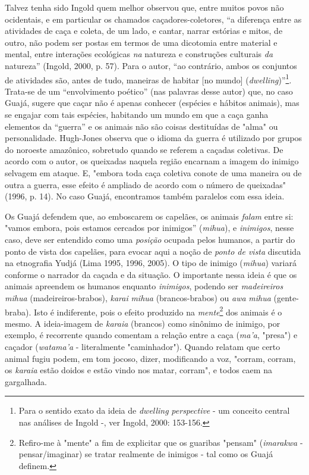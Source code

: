 Talvez tenha sido Ingold quem melhor observou que, entre muitos povos
não ocidentais, e em particular os chamados caçadores-coletores, ``a
diferença entre as atividades de caça e coleta, de um lado, e cantar,
narrar estórias e mitos, de outro, não podem ser postas em termos de uma
dicotomia entre material e mental, entre interações ecológicas \emph{na}
natureza e construções culturais \emph{da} natureza'' (Ingold, 2000, p.
57). Para o autor, ``ao contrário, ambos os conjuntos de atividades são,
antes de tudo, maneiras de habitar {[}no mundo{]}
(\emph{dwelling})''\footnote{Para o sentido exato da ideia de
  \emph{dwelling} \emph{perspective} - um conceito central nas análises
  de Ingold -, ver Ingold, 2000: 153-156.}. Trata-se de um
``envolvimento poético'' (nas palavras desse autor) que, no caso Guajá,
sugere que caçar não é apenas conhecer (espécies e hábitos animais), mas
se engajar com tais espécies, habitando um mundo em que a caça ganha
elementos da ``guerra'' e os animais não são coisas destituídas de
"alma" ou personalidade. Hugh-Jones observa que o idioma da guerra é
utilizado por grupos do noroeste amazônico, sobretudo quando se referem
a caçadas coletivas. De acordo com o autor, os queixadas naquela região
encarnam a imagem do inimigo selvagem em ataque. E, "embora toda caça
coletiva conote de uma maneira ou de outra a guerra, esse efeito é
ampliado de acordo com o número de queixadas" (1996, p. 14). No caso
Guajá, encontramos também paralelos com essa ideia.

Os Guajá defendem que, ao emboscarem os capelães, os animais
\emph{falam} entre si: "vamos embora, pois estamos cercados por
inimigos'' (\emph{mihua}), e \emph{inimigos}, nesse caso, deve ser
entendido como uma \emph{posição} ocupada pelos humanos, a partir do
ponto de vista dos capelães, para evocar aqui a noção de \emph{ponto de
vista} discutida na etnografia Yudjá (Lima 1995, 1996, 2005). O tipo de
inimigo (\emph{mihua}) variará conforme o narrador da caçada e da
situação. O importante nessa ideia é que os animais apreendem os humanos
enquanto \emph{inimigos}, podendo ser \emph{madeireiros mihua}
(madeireiros-brabos), \emph{karai} \emph{mihua} (brancos-brabos) ou
\emph{awa} \emph{mihua} (gente-braba). Isto é indiferente, pois o efeito
produzido na \emph{mente}\footnote{Refiro-me à "mente" a fim de
  explicitar que os guaribas "pensam" (\emph{imarakwa} -
  pensar/imaginar) se tratar realmente de inimigos - tal como os Guajá
  definem.} dos animais é o mesmo. A ideia-imagem de \emph{karaia}
(brancos) como sinônimo de inimigo, por exemplo, é recorrente quando
comentam a relação entre a caça (\emph{ma'a}, "presa") e caçador
(\emph{watama'a} - literalmente "caminhador"). Quando relatam que certo
animal fugiu podem, em tom jocoso, dizer, modificando a voz, "corram,
corram, os \emph{karaia} estão doidos e estão vindo nos matar, corram",
e todos caem na gargalhada.

